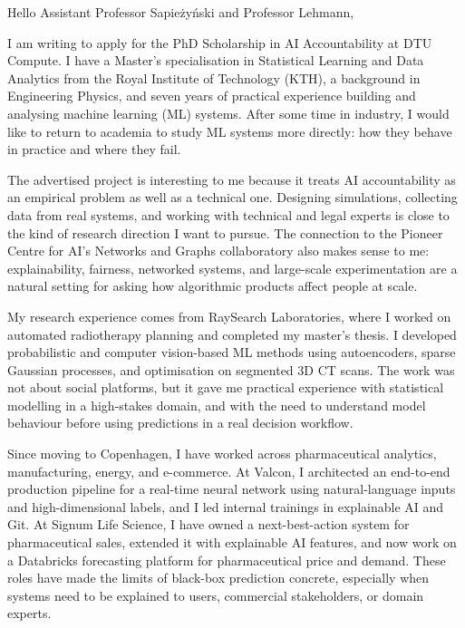 \documentclass[11pt,a4paper]{moderncv}
\begin{document}
\makecvtitle
Hello Assistant Professor Sapieżyński and Professor Lehmann,

\vspace*{2em}
I am writing to apply for the PhD Scholarship in AI Accountability at DTU Compute. I have a Master's specialisation in Statistical Learning and Data Analytics from the Royal Institute of Technology (KTH), a background in Engineering Physics, and seven years of practical experience building and analysing machine learning (ML) systems. After some time in industry, I would like to return to academia to study ML systems more directly: how they behave in practice and where they fail.

\hspace*{2em}
The advertised project is interesting to me because it treats AI accountability as an empirical problem as well as a technical one. Designing simulations, collecting data from real systems, and working with technical and legal experts is close to the kind of research direction I want to pursue. The connection to the Pioneer Centre for AI's Networks and Graphs collaboratory also makes sense to me: explainability, fairness, networked systems, and large-scale experimentation are a natural setting for asking how algorithmic products affect people at scale.

\hspace*{2em}
My research experience comes from RaySearch Laboratories, where I worked on automated radiotherapy planning and completed my master's thesis. I developed probabilistic and computer vision-based ML methods using autoencoders, sparse Gaussian processes, and optimisation on segmented 3D CT scans. The work was not about social platforms, but it gave me practical experience with statistical modelling in a high-stakes domain, and with the need to understand model behaviour before using predictions in a real decision workflow.

\hspace*{2em}
Since moving to Copenhagen, I have worked across pharmaceutical analytics, manufacturing, energy, and e-commerce. At Valcon, I architected an end-to-end production pipeline for a real-time neural network using natural-language inputs and high-dimensional labels, and I led internal trainings in explainable AI and Git. At Signum Life Science, I have owned a next-best-action system for pharmaceutical sales, extended it with explainable AI features, and now work on a Databricks forecasting platform for pharmaceutical price and demand. These roles have made the limits of black-box prediction concrete, especially when systems need to be explained to users, commercial stakeholders, or domain experts.
\end{document}
